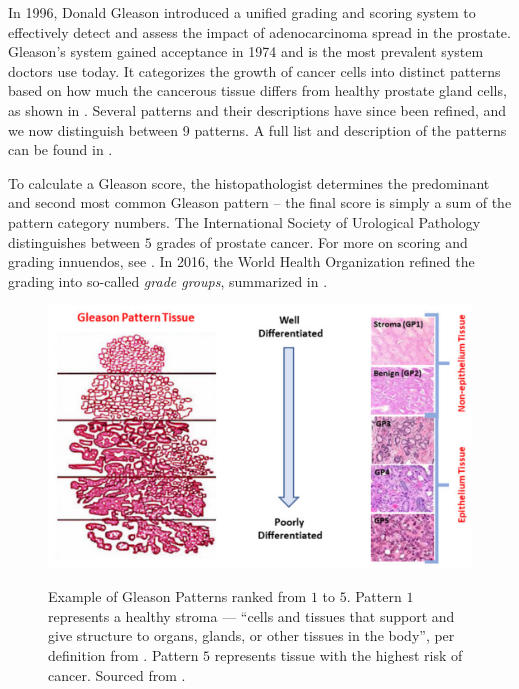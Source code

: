 In 1996, Donald Gleason introduced a unified grading and scoring system to effectively detect and assess the impact of adenocarcinoma spread in the prostate.
Gleason's system gained acceptance in 1974 and is the most prevalent system doctors use today.
It categorizes the growth of cancer cells into distinct patterns based on how much the cancerous tissue differs from healthy prostate gland cells, as shown in .
Several patterns and their descriptions have since been refined, and we now distinguish between 9 patterns.
A full list and description of the patterns can be found in \cite{gleason-patterns}.

To calculate a Gleason score, the histopathologist determines the predominant and second most common Gleason pattern -- the final score is simply a sum of the pattern category numbers.
The International Society of Urological Pathology distinguishes between $5$ grades of prostate cancer.
For more on scoring and grading innuendos, see \cite{gleason-pattern-grading}.
In 2016, the World Health Organization refined the grading into so-called \emph{grade groups}, summarized in \cite{who-grade-groups}.

\begin{figure}
    \begin{center}
    \begin{minipage}{1\textwidth}
      {\includegraphics[width=\textwidth]{img/gp-classification.png}}
    \end{minipage}
    \caption{Example of Gleason Patterns ranked from $1$ to $5$. Pattern $1$ represents a healthy stroma --- ``cells and tissues that support and give structure to organs, glands, or other tissues in the body'', per definition from \cite{nci-stroma}. Pattern $5$ represents tissue with the highest risk of cancer. Sourced from \cite{gleason-pattern-description}.}
    \label{fig:gp}
    \end{center}
\end{figure}

